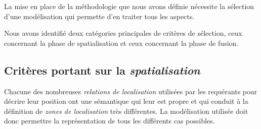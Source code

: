 La mise en place de la méthodologie que nous avons définie nécessite
la sélection d'une modélisation qui permette d'en traiter tous les
aspects.

Nous avons identifié deux catégories principales de critères de
sélection, ceux concernant la phase de spatialisation et ceux
concernant la phase de fusion.

\subsection{Critères portant sur la \emph{spatialisation}}

Chacune des nombreuses \emph{relations de localisation} utilisées par
les requérants pour décrire leur position ont une sémantique qui leur
est propre et qui conduit à la définition de \emph{zones de
  localisation} très différentes. La modélisation utilisée doit donc
permettre la représentation de tous les différents cas possibles.


